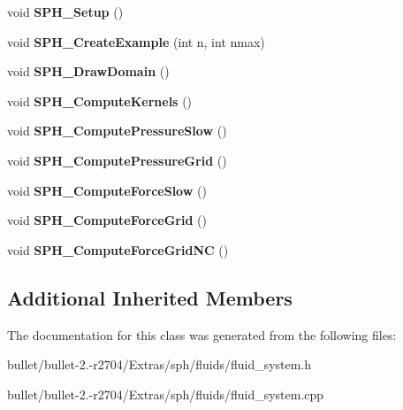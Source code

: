 \begin{DoxyCompactItemize}
\item 
\hypertarget{class_fluid_system_a9f9f85407e364f70fad0f7afea0eeda0}{void {\bfseries S\+P\+H\+\_\+\+Setup} ()}\label{class_fluid_system_a9f9f85407e364f70fad0f7afea0eeda0}

\item 
\hypertarget{class_fluid_system_a716cfcd123f0950d554102b1a94da1fb}{void {\bfseries S\+P\+H\+\_\+\+Create\+Example} (int n, int nmax)}\label{class_fluid_system_a716cfcd123f0950d554102b1a94da1fb}

\item 
\hypertarget{class_fluid_system_a1c75705313c32ba4439eb34ab958ad07}{void {\bfseries S\+P\+H\+\_\+\+Draw\+Domain} ()}\label{class_fluid_system_a1c75705313c32ba4439eb34ab958ad07}

\item 
\hypertarget{class_fluid_system_a9e7a65b8058284a811a3761ba13e0424}{void {\bfseries S\+P\+H\+\_\+\+Compute\+Kernels} ()}\label{class_fluid_system_a9e7a65b8058284a811a3761ba13e0424}

\item 
\hypertarget{class_fluid_system_aba2e20a350f00d8218aa20ee34881365}{void {\bfseries S\+P\+H\+\_\+\+Compute\+Pressure\+Slow} ()}\label{class_fluid_system_aba2e20a350f00d8218aa20ee34881365}

\item 
\hypertarget{class_fluid_system_ab42ba0a84fbbe21eb1554163b86b8fdd}{void {\bfseries S\+P\+H\+\_\+\+Compute\+Pressure\+Grid} ()}\label{class_fluid_system_ab42ba0a84fbbe21eb1554163b86b8fdd}

\item 
\hypertarget{class_fluid_system_abc6b83b74851d02b83fdce3201654c43}{void {\bfseries S\+P\+H\+\_\+\+Compute\+Force\+Slow} ()}\label{class_fluid_system_abc6b83b74851d02b83fdce3201654c43}

\item 
\hypertarget{class_fluid_system_a3ce38e728e059715dcd5fe1a24accf0e}{void {\bfseries S\+P\+H\+\_\+\+Compute\+Force\+Grid} ()}\label{class_fluid_system_a3ce38e728e059715dcd5fe1a24accf0e}

\item 
\hypertarget{class_fluid_system_a4e362ec031fc5cb1189af777e13d387a}{void {\bfseries S\+P\+H\+\_\+\+Compute\+Force\+Grid\+N\+C} ()}\label{class_fluid_system_a4e362ec031fc5cb1189af777e13d387a}

\end{DoxyCompactItemize}
\subsection*{Additional Inherited Members}


The documentation for this class was generated from the following files\+:\begin{DoxyCompactItemize}
\item 
bullet/bullet-\/2.-\/r2704/\+Extras/sph/fluids/fluid\+\_\+system.\+h\item 
bullet/bullet-\/2.-\/r2704/\+Extras/sph/fluids/fluid\+\_\+system.\+cpp\end{DoxyCompactItemize}
